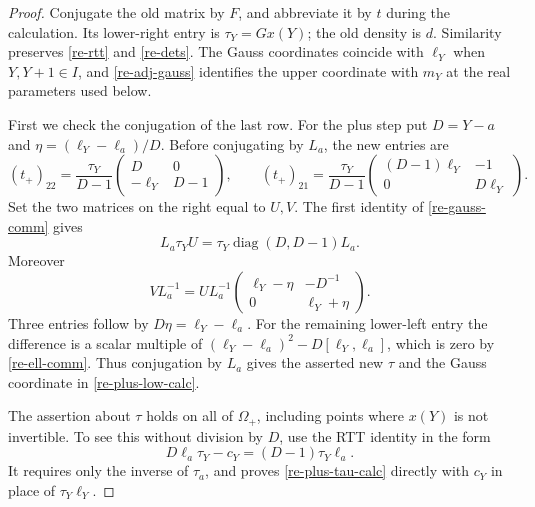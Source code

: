 \begin{proof}
Conjugate the old matrix by \(F\), and abbreviate it by \(t\)
during the calculation.  Its lower-right entry is
\(\tau_Y=Gx(Y)\); the old density is \(d\).
Similarity preserves \eqref{re-rtt} and \eqref{re-dets}.
The Gauss coordinates coincide with \(\ell_Y\) when
\(Y,Y+1\in I\), and \eqref{re-adj-gauss} identifies the upper
coordinate with \(m_Y\) at the real parameters used below.

First we check the conjugation of the last row.  For the plus
step put \(D=Y-a\) and
\(\eta=(\ell_Y-\ell_a)/D\).  Before conjugating by \(L_a\),
the new entries are
\begin{equation}
 (t_+)_{22}=\frac{\tau_Y}{D-1}
      \begin{pmatrix}D&0\\-\ell_Y&D-1\end{pmatrix},\qquad
 (t_+)_{21}=\frac{\tau_Y}{D-1}
      \begin{pmatrix}(D-1)\ell_Y&-1\\0&D\ell_Y\end{pmatrix}.
                                                               \label{re-plus-blocks}
\end{equation}
Set the two matrices on the right equal to \(U,V\).
The first identity of \eqref{re-gauss-comm} gives
\begin{equation}
 L_a\tau_Y U
       =\tau_Y\operatorname{diag}(D,D-1)L_a.
                                                               \label{re-plus-tau-calc}
\end{equation}
Moreover
\begin{equation}
 V L_a^{-1}
 =U L_a^{-1}
       \begin{pmatrix}\ell_Y-\eta&-D^{-1}\\0&\ell_Y+\eta\end{pmatrix}.
                                                               \label{re-plus-low-calc}
\end{equation}
Three entries follow by \(D\eta=\ell_Y-\ell_a\).
For the remaining lower-left entry the difference is a scalar
multiple of
\((\ell_Y-\ell_a)^2-D[\ell_Y,\ell_a]\), which is zero
by \eqref{re-ell-comm}.
Thus conjugation by \(L_a\) gives the asserted new
\(\tau\) and the Gauss coordinate in
\eqref{re-plus-low-calc}.

The assertion about \(\tau\) holds on all of \(\Omega_+\),
including points where \(x(Y)\) is not invertible.
To see this without division by \(D\), use the RTT identity
in the form
\begin{equation}
 D\ell_a\tau_Y-c_Y=(D-1)\tau_Y\ell_a .
                                                               \label{re-plus-all-reg}
\end{equation}
It requires only the inverse of \(\tau_a\), and proves
\eqref{re-plus-tau-calc} directly with \(c_Y\) in place of
\(\tau_Y\ell_Y\).


\end{proof}
